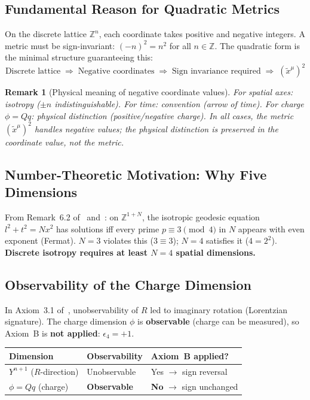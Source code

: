 \documentclass[12pt,a4paper]{article}
\newtheorem*{remark}{Remark}
\begin{document}
\subsection{Fundamental Reason for Quadratic Metrics}

On the discrete lattice $\mathbb{Z}^n$, each coordinate takes positive and negative integers. A metric must be sign-invariant: $(-n)^2 = n^2$ for all $n \in \mathbb{Z}$. The quadratic form is the minimal structure guaranteeing this:
\begin{equation}
\text{Discrete lattice} \;\Longrightarrow\; \text{Negative coordinates} \;\Longrightarrow\; \text{Sign invariance required} \;\Longrightarrow\; (\tilde{x}^\mu)^2 \tag{1.1}
\end{equation}

\begin{remark}[Physical meaning of negative coordinate values]
For spatial axes: isotropy ($\pm n$ indistinguishable). For time: convention (arrow of time). For charge $\phi = Qq$: physical distinction (positive/negative charge). In all cases, the metric $(\tilde{x}^\mu)^2$ handles negative values; the physical distinction is preserved in the coordinate value, not the metric.
\end{remark}

\subsection{Number-Theoretic Motivation: Why Five Dimensions}

From Remark~6.2 of~\cite{Paper2} and~\cite{Kihara2026b}: on $\mathbb{Z}^{1+N}$, the isotropic geodesic equation $l^2 + t^2 = Nx^2$ has solutions iff every prime $p \equiv 3 \pmod{4}$ in $N$ appears with even exponent (Fermat). $N=3$ violates this ($3 \equiv 3$); $N=4$ satisfies it ($4=2^2$). \textbf{Discrete isotropy requires at least $N=4$ spatial dimensions.}

\subsection{Observability of the Charge Dimension}

In Axiom~3.1 of~\cite{Paper2}, unobservability of $R$ led to imaginary rotation (Lorentzian signature). The charge dimension $\phi$ is \textbf{observable} (charge can be measured), so Axiom~B is \textbf{not applied}: $\epsilon_4 = +1$.

\begin{center}
\begin{tabular}{lll}
\toprule
Dimension & Observability & Axiom~B applied? \\
\midrule
$Y^{n+1}$ ($R$-direction) & Unobservable & Yes $\to$ sign reversal \\
$\phi = Qq$ (charge) & \textbf{Observable} & \textbf{No} $\to$ sign unchanged \\
\bottomrule
\end{tabular}
\end{center}
\end{document}
